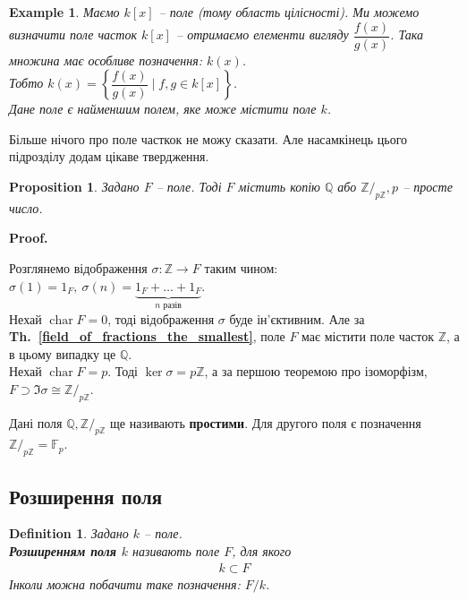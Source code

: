 \documentclass[a4paper, 10pt]{article}
\makeatletter
\theoremstyle{theoremdd}
\theoremstyle{theoremdd}
\newtheorem{definition}[theorem]{Definition}
\theoremstyle{theoremdd}
\theoremstyle{theoremdd}
\theoremstyle{theoremdd}
\newtheorem{example}[theorem]{Example}
\theoremstyle{theoremdd}
\theoremstyle{theoremdd}
\theoremstyle{theoremdd}
\theoremstyle{theoremdd}
\newtheorem{proposition}[theorem]{Proposition}
\theoremstyle{theoremdd}
\theoremstyle{theoremdd}
\theoremstyle{theoremdd}
\theoremstyle{theoremdd}
\theoremstyle{theoremdd}
\theoremstyle{theoremdd}
\renewenvironment{proof}[1][Proof.\\]{\par
\pushQED{\hfill \qed}%
\normalfont \topsep6\p@\@plus6\p@\relax
\trivlist
\item\relax
{\bfseries
#1\@addpunct{.}}\hspace\labelsep\ignorespaces
}{%
\popQED\endtrivlist\@endpefalse
}
\DeclareMathOperator{\charac}{char}
\newcommand\thref[1]{\textbf{Th.~\ref{#1}}}
\makeatother
\begin{document}
\begin{example}
Маємо $k[x]$ -- поле (тому область цілісності). Ми можемо визначити поле часток $k[x]$ -- отримаємо елементи вигляду $\dfrac{f(x)}{g(x)}$. Така множина має особливе позначення: $k(x)$.\\
Тобто $k(x) = \left\{ \dfrac{f(x)}{g(x)} \mid f,g \in k[x] \right\}$.\\
Дане поле є найменшим полем, яке може містити поле $k$.
\end{example}

Більше нічого про поле часткок не можу сказати. Але насамкінець цього підрозділу додам цікаве твердження.

\begin{proposition}
\label{field_contains_either_rationals_or_residue_claa_mod_p}
Задано $F$ -- поле. Тоді $F$ містить копію $\mathbb{Q}$ або $\mathbb{Z}/_{p \mathbb{Z}}, p$ -- просте число.
\end{proposition}

\begin{proof}
Розглянемо відображення $\sigma \colon \mathbb{Z} \to F$ таким чином: $\sigma(1) = 1_F,\ \sigma(n) = \underbrace{1_F+\dots+1_F}_{n\text{ разів}}$.\\
Нехай $\charac F = 0$, тоді відображення $\sigma$ буде ін'єктивним. Але за  \thref{field_of_fractions_the_smallest}, поле $F$ має містити поле часток $\mathbb{Z}$, а в цьому випадку це $\mathbb{Q}$.\\
Нехай $\charac F = p$. Тоді $\ker \sigma = p \mathbb{Z}$, а за першою теоремою про ізоморфізм, $F \supset \Im \sigma \cong \mathbb{Z}/_{p \mathbb{Z}}$.
\end{proof}

Дані поля $\mathbb{Q}, \mathbb{Z}/_{p \mathbb{Z}}$ ще називають \textbf{простими}. Для другого поля є позначення $\mathbb{Z}/_{p \mathbb{Z}} = \mathbb{F}_p$.

\subsection{Розширення поля}
\begin{definition}
Задано $k$ -- поле.\\
\textbf{Розширенням поля $k$} називають поле $F$, для якого
\begin{align*}
k \subset F
\end{align*}
Інколи можна побачити таке позначення: $F/k$.
\end{definition}
\end{document}
